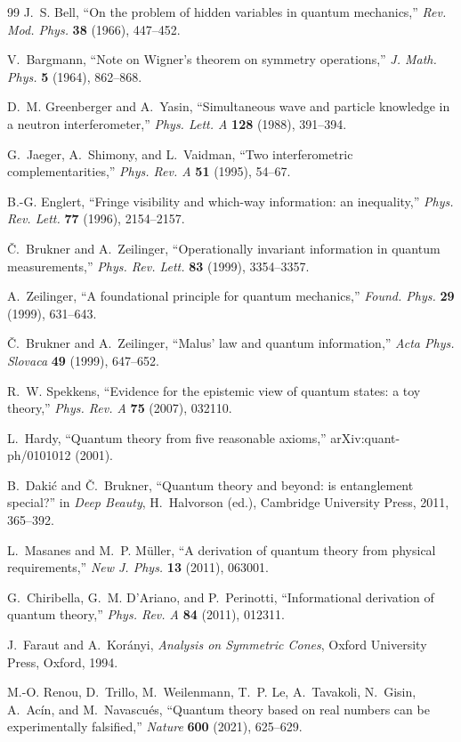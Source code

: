 \documentclass[11pt]{article}
\theoremstyle{definition}
\theoremstyle{remark}
\begin{document}
\begin{thebibliography}{99}
J.~S. Bell, ``On the problem of hidden variables in quantum mechanics,''
\emph{Rev. Mod. Phys.} \textbf{38} (1966), 447--452.

V.~Bargmann, ``Note on Wigner's theorem on symmetry operations,''
\emph{J. Math. Phys.} \textbf{5} (1964), 862--868.

D.~M. Greenberger and A.~Yasin, ``Simultaneous wave and particle
knowledge in a neutron interferometer,'' \emph{Phys. Lett. A}
\textbf{128} (1988), 391--394.

G.~Jaeger, A.~Shimony, and L.~Vaidman, ``Two interferometric
complementarities,'' \emph{Phys. Rev. A} \textbf{51} (1995), 54--67.

B.-G. Englert, ``Fringe visibility and which-way information: an
inequality,'' \emph{Phys. Rev. Lett.} \textbf{77} (1996), 2154--2157.

\v{C}.~Brukner and A.~Zeilinger, ``Operationally invariant information in
quantum measurements,'' \emph{Phys. Rev. Lett.} \textbf{83} (1999),
3354--3357.

A.~Zeilinger, ``A foundational principle for quantum mechanics,''
\emph{Found. Phys.} \textbf{29} (1999), 631--643.

\v{C}.~Brukner and A.~Zeilinger, ``Malus' law and quantum information,''
\emph{Acta Phys. Slovaca} \textbf{49} (1999), 647--652.

R.~W. Spekkens, ``Evidence for the epistemic view of quantum states: a
toy theory,'' \emph{Phys. Rev. A} \textbf{75} (2007), 032110.

L.~Hardy, ``Quantum theory from five reasonable axioms,''
arXiv:quant-ph/0101012 (2001).

B.~Daki\'c and \v{C}.~Brukner, ``Quantum theory and beyond: is
entanglement special?'' in \emph{Deep Beauty}, H.~Halvorson (ed.),
Cambridge University Press, 2011, 365--392.

L.~Masanes and M.~P. M\"uller, ``A derivation of quantum theory from
physical requirements,'' \emph{New J. Phys.} \textbf{13} (2011), 063001.

G.~Chiribella, G.~M. D'Ariano, and P.~Perinotti, ``Informational
derivation of quantum theory,'' \emph{Phys. Rev. A} \textbf{84} (2011),
012311.

J.~Faraut and A.~Kor\'anyi, \emph{Analysis on Symmetric Cones}, Oxford
University Press, Oxford, 1994.

M.-O. Renou, D.~Trillo, M.~Weilenmann, T.~P. Le, A.~Tavakoli, N.~Gisin,
A.~Ac\'in, and M.~Navascu\'es, ``Quantum theory based on real numbers can
be experimentally falsified,'' \emph{Nature} \textbf{600} (2021),
625--629.

\end{thebibliography}
\end{document}
